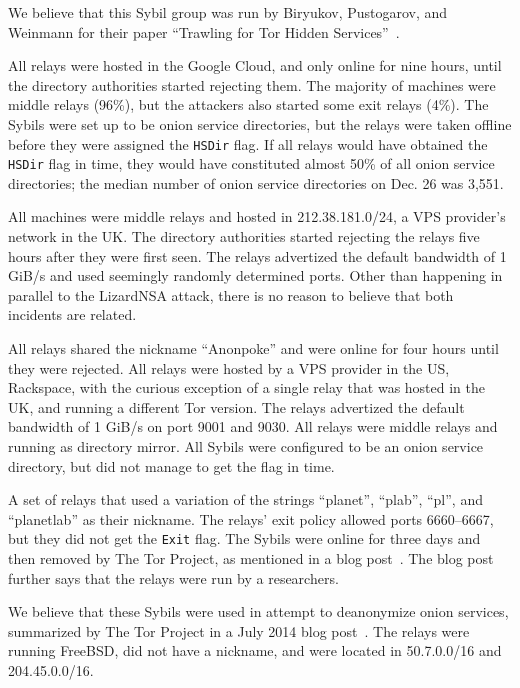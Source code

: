 We believe that this Sybil group was run by Biryukov, Pustogarov, and Weinmann
for their paper ``Trawling for Tor Hidden Services''~\cite{Biryukov2013a}.

All relays were hosted in the Google Cloud, and only online for nine hours,
until the directory authorities started rejecting them.  The majority of
machines were middle relays (96\%), but the attackers also started some exit
relays (4\%).  The Sybils were set up to be onion service directories, but the
relays were taken offline before they were assigned the \texttt{HSDir} flag.  If
all relays would have obtained the \texttt{HSDir} flag in time, they would have
constituted almost 50\% of all onion service directories; the median number of
onion service directories on Dec. 26 was 3,551.

All machines were middle relays and hosted in 212.38.181.0/24, a VPS provider's
network in the UK.  The directory authorities started rejecting the relays five
hours after they were first seen.  The relays advertized the default bandwidth
of 1 GiB/s and used seemingly randomly determined ports.  Other than happening
in parallel to the LizardNSA attack, there is no reason to believe that both
incidents are related.

All relays shared the nickname ``Anonpoke'' and were online for four hours until
they were rejected.  All relays were hosted by a VPS provider in the US,
Rackspace, with the curious exception of a single relay that was hosted in the
UK, and running a different Tor version.  The relays advertized the default
bandwidth of 1 GiB/s on port 9001 and 9030.  All relays were middle relays and
running as directory mirror.  All Sybils were configured to be an onion service
directory, but did not manage to get the flag in time.

A set of relays that used a variation of the strings ``planet'', ``plab'',
``pl'', and ``planetlab'' as their nickname.  The relays' exit policy allowed
ports 6660--6667, but they did not get the \texttt{Exit} flag.  The Sybils were
online for three days and then removed by The Tor Project, as mentioned in a
blog post~\cite{progressreport}.  The blog post further says that the relays
were run by a researchers.

We believe that these Sybils were used in attempt to deanonymize onion services,
summarized by The Tor Project in a July 2014 blog post~\cite{cmucert}.  The
relays were running FreeBSD, did not have a nickname, and were located in
50.7.0.0/16 and 204.45.0.0/16.

